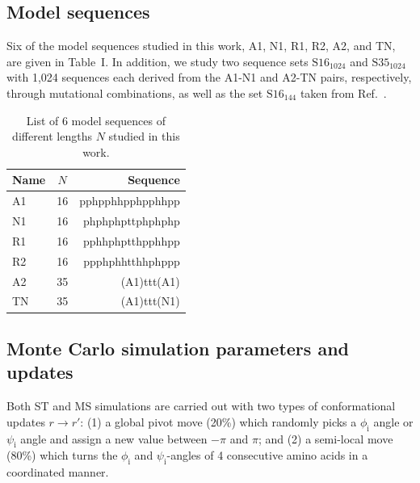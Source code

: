 \documentclass[
aip,
rsi,%
amsmath,amssymb,
reprint,%
]{revtex4-1}
\newcommand	 {\rbar}	{{r}}
\begin{document}
\subsection{Model sequences}

Six of the model sequences studied in this work, A1, N1, R1, R2, A2, and TN, are given in Table~I. In addition, we study two sequence sets $\mathrm{S16}_{1024}$  and $\mathrm{S35}_{1024}$ with 1,024 sequences each derived from the A1-N1 and A2-TN pairs, respectively, through mutational combinations, as well as the set $\mathrm{S16}_{144}$ taken from  Ref.~\protect{}. 
 
\begin{table}
\caption{\label{tab1} List of 6 model sequences of different lengths $N$ studied in this work.}
\begin{ruledtabular}
\begin{tabular}{lcr}
Name & $N$ & Sequence \\
\hline
A1 & 16 & pphpphhpphpphhpp \\
N1 & 16 & phphphpttphphphp \\
R1 & 16 & pphhphptthpphhpp\\
R2 & 16 & ppphphhtthhphppp\\
A2 & 35 & (A1)ttt(A1)\\
TN & 35 & (A1)ttt(N1)\\
\end{tabular}
\end{ruledtabular}
\end{table}


\subsection{Monte Carlo simulation parameters and updates}

Both ST and MS simulations are carried out with two types of conformational updates $\rbar\rightarrow\rbar'$: (1) a global pivot move (20\%) which randomly picks a $\phi_\mathrm{i}$ angle or $\psi_\mathrm{i}$ angle and assign a new value between $-\pi$ and $\pi$; and (2) a semi-local move (80\%) which turns the $\phi_\mathrm{i}$ and $\psi_\mathrm{i}$-angles of 4 consecutive amino acids in a coordinated manner.~\cite{Favrin2001} 

\end{document}
